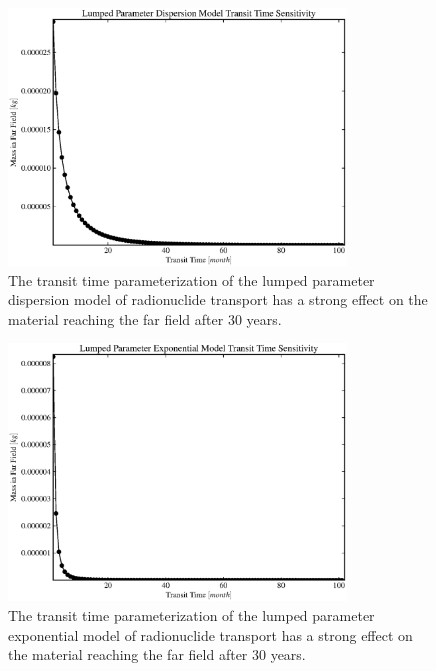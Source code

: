 
\begin{figure}[ht]
\centering
\includegraphics[width=0.8\textwidth]{./chapters/demonstration/base/lpDM_t_t.eps}
\caption[Lumped Parameter Dispersion Model Transit Time Sensitivity]{The transit time 
parameterization of the lumped parameter dispersion model of radionuclide 
transport has a strong effect on the material reaching the far field after 30 
years.  }
\label{fig:lp_t_t_begin}
\end{figure}

\begin{figure}[ht]
\centering
\includegraphics[width=0.8\textwidth]{./chapters/demonstration/base/lpEXPM_t_t.eps}
\caption[Lumped Parameter Exponential Model Transit Time Sensitivity]{The transit time 
parameterization of the lumped parameter exponential model of radionuclide 
transport has a strong effect on the material reaching the far field after 30 
years.  }
\end{figure}

